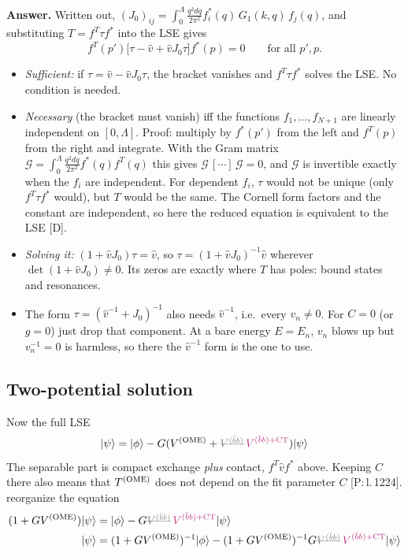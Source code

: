 \documentclass[11pt,a4paper]{article}
\newcommand{\tagP}[1]{\textcolor{blue!65!black}{\textsf{\small[P:\,#1]}}}
\newcommand{\tagD}{\textcolor{orange!85!black}{\textsf{\small[D]}}}
\renewcommand{\VQQ}{V^{(\bar bb)}}
\renewcommand{\VOME}{V^{\rm (OME)}}
\renewcommand{\TOME}{T^{\rm (OME)}}
\newcommand{\ai}[1]{\textcolor{aicolor}{#1}}
\newcommand{\aifixm}[2]{\textcolor{gray}{\text{\sout{$#1$}}}\,\textcolor{aicolor}{#2}}
\newcommand{\ai}[1]{#1}
\newcommand{\aifixm}[2]{#2}
\newenvironment{aiadd}{\par}{\par}
\begin{document}
\begin{aiadd}
	\textbf{Answer.} Written out, $(J_0)_{ij}=\int_0^\Lambda\frac{q^2dq}{2\pi^2}f_i^*(q)\,G_1(k,q)\,f_j(q)$, and substituting $T=f^T\tau f^*$ into the LSE gives
	\[
		f^T(p')\big[\tau-\hat v+\hat vJ_0\tau\big]f^*(p)=0\qquad\text{for all }p',p .
	\]
	\begin{itemize}
		\item \emph{Sufficient:} if $\tau=\hat v-\hat vJ_0\tau$, the bracket vanishes and $f^T\tau f^*$ solves the LSE. No condition is needed.
		\item \emph{Necessary} (the bracket must vanish) iff the functions $f_1,\dots,f_{N+1}$ are linearly independent on $[0,\Lambda]$. Proof: multiply by $f^*(p')$ from the left and $f^T(p)$ from the right and integrate. With the Gram matrix $\mathcal G=\int_0^\Lambda\frac{q^2dq}{2\pi^2}f^*(q)f^T(q)$ this gives $\mathcal G\,[\cdots]\,\mathcal G=0$, and $\mathcal G$ is invertible exactly when the $f_i$ are independent. For dependent $f_i$, $\tau$ would not be unique (only $f^T\tau f^*$ would), but $T$ would be the same. The Cornell form factors and the constant are independent, so here the reduced equation is equivalent to the LSE \tagD.
		\item \emph{Solving it:} $(1+\hat vJ_0)\tau=\hat v$, so $\tau=(1+\hat vJ_0)^{-1}\hat v$ wherever $\det(1+\hat vJ_0)\neq0$. Its zeros are exactly where $T$ has poles: bound states and resonances.
		\item The form $\tau=(\hat v^{-1}+J_0)^{-1}$ also needs $\hat v^{-1}$, i.e.\ every $v_n\neq0$. For $C=0$ (or $g=0$) just drop that component. At a bare energy $E=E_n$, $v_n$ blows up but $v_n^{-1}=0$ is harmless, so there the $\hat v^{-1}$ form is the one to use.
	\end{itemize}
\end{aiadd}


\subsection{Two-potential solution}

Now the full LSE
\[
	\lvert \psi \rangle = \lvert \phi \rangle - G(\VOME + \aifixm{\VQQ}{V^{(\bar bb)+{\rm CT}}}) \lvert \psi \rangle
\]
\ai{The separable part is compact exchange \emph{plus} contact, $f^T\hat vf^*$ above. Keeping $C$ there also means that $\TOME$ does not depend on the fit parameter $C$ \tagP{l.\,1224}.}
reorganize the equation
\begin{align}
	(1 + G \VOME)\lvert \psi \rangle & = \lvert \phi \rangle - G \aifixm{\VQQ}{V^{(\bar bb)+{\rm CT}}} \lvert \psi \rangle                                    \\
	\lvert \psi \rangle              & = (1 + G \VOME)^{-1}\lvert \phi \rangle - (1 + G\VOME)^{-1}G \aifixm{\VQQ}{V^{(\bar bb)+{\rm CT}}} \lvert \psi \rangle
\end{align}
\end{document}
